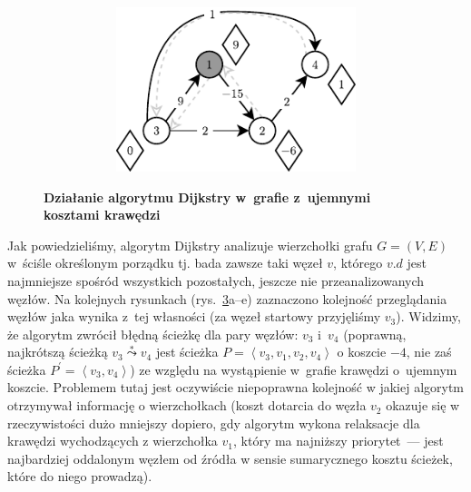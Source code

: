 \begin{figure}[!htbp]
\begin{subfigure}[b]{\textwidth}
\begin{subfigure}[b]{0.31\textwidth}
			\includegraphics[width=\textwidth]{Chapter_II/DIJKSTRA-NegativeArc/e.pdf}
			\caption{}
			\label{fig:exapleDijkstraNegativArc:e}
		\end{subfigure}
		\hfill\null
	\end{subfigure}
	\caption{
		\textbf{Działanie algorytmu Dijkstry w~grafie z~ujemnymi kosztami krawędzi}
	}
	\label{fig:exapleDijkstraNegativArc}
\end{figure}

Jak powiedzieliśmy, algorytm Dijkstry analizuje wierzchołki grafu $G = \left( V, E \right)$ w~ściśle określonym porządku tj. bada zawsze taki węzeł $v$, którego $v.d$ jest najmniejsze spośród wszystkich pozostałych, jeszcze nie przeanalizowanych węzłów.
Na kolejnych rysunkach (rys.~\ref{fig:exapleDijkstraNegativArc}a--e) zaznaczono kolejność przeglądania węzłów jaka wynika z~tej własności (za węzeł startowy przyjęliśmy $v_{3}$).
Widzimy, że algorytm zwrócił błędną ścieżkę dla pary węzłów: $v_{3}$ i~$v_{4}$ (poprawną, najkrótszą ścieżką $v_{3} \overset{*}\leadsto v_{4}$ jest ścieżka $P = \left \langle v_{3}, v_{1}, v_{2}, v_{4} \right \rangle$ o koszcie $-4$, nie zaś ścieżka $P^{'} = \left \langle v_{3}, v_{4} \right \rangle$) ze względu na wystąpienie w~grafie krawędzi o~ujemnym koszcie.
Problemem tutaj jest oczywiście niepoprawna kolejność w jakiej algorytm otrzymywał informację o wierzchołkach (koszt dotarcia do węzła $v_{2}$ okazuje się w rzeczywistości dużo mniejszy dopiero, gdy algorytm wykona relaksacje dla krawędzi wychodzących z wierzchołka $v_{1}$, który ma najniższy priorytet~--- jest najbardziej oddalonym węzłem od źródła w sensie sumarycznego kosztu ścieżek, które do niego prowadzą).



